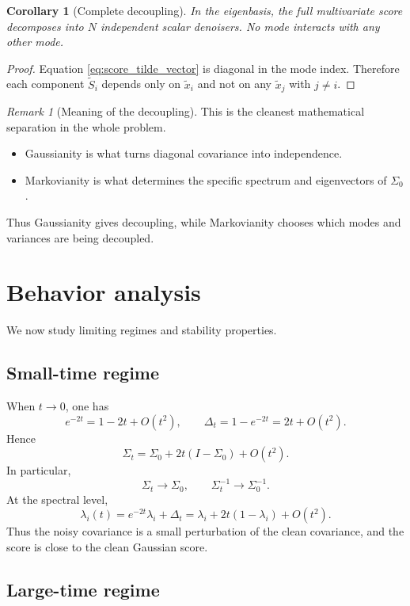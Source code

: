 \documentclass[11pt]{article}
\numberwithin{equation}{section}
\newtheorem{corollary}[theorem]{Corollary}
\theoremstyle{definition}
\theoremstyle{remark}
\newtheorem{remark}[theorem]{Remark}
\newcommand{\Id}{I}
\begin{document}
\begin{corollary}[Complete decoupling]
In the eigenbasis, the full multivariate score decomposes into $N$ independent scalar denoisers. No mode interacts with any other mode.
\end{corollary}

\begin{proof}
Equation \eqref{eq:score_tilde_vector} is diagonal in the mode index. Therefore each component $\widetilde S_i$ depends only on $\widetilde x_i$ and not on any $\widetilde x_j$ with $j\neq i$.
\end{proof}

\begin{remark}[Meaning of the decoupling]
This is the cleanest mathematical separation in the whole problem.
\begin{itemize}[leftmargin=1cm]
\item Gaussianity is what turns diagonal covariance into independence.
\item Markovianity is what determines the specific spectrum and eigenvectors of $\Sigma_0$.
\end{itemize}
Thus Gaussianity gives decoupling, while Markovianity chooses which modes and variances are being decoupled.
\end{remark}

\section{Behavior analysis}\label{sec:behavior}

We now study limiting regimes and stability properties.

\subsection{Small-time regime}

When $t\to 0$, one has
\[
e^{-2t}=1-2t+O(t^2),
\qquad
\Delta_t=1-e^{-2t}=2t+O(t^2).
\]
Hence
\[
\Sigma_t=\Sigma_0+2t(\Id-\Sigma_0)+O(t^2).
\]
In particular,
\[
\Sigma_t\to \Sigma_0,\qquad \Sigma_t^{-1}\to \Sigma_0^{-1}.
\]
At the spectral level,
\[
\lambda_i(t)=e^{-2t}\lambda_i+\Delta_t
=\lambda_i+2t(1-\lambda_i)+O(t^2).
\]
Thus the noisy covariance is a small perturbation of the clean covariance, and the score is close to the clean Gaussian score.

\subsection{Large-time regime}
\end{document}
